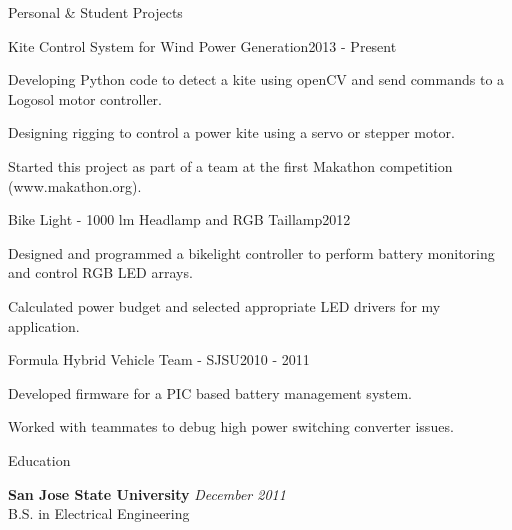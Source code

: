 \documentclass{resume} %
\begin{document}
\pagebreak[3]
\begin{rSection}{Personal \& Student Projects}

\ssquish
\begin{rProject}{Kite Control System for Wind Power Generation}{2013 - Present}
\item Developing Python code to detect a kite using openCV and send commands to a Logosol motor controller.
\item Designing rigging to control a power kite using a servo or stepper motor.
\item Started this project as part of a team at the first Makathon competition (www.makathon.org).
\end{rProject}

\ssquish
\begin{rProject}{Bike Light - 1000 lm Headlamp and RGB Taillamp}{2012}
\item Designed and programmed a bikelight controller to perform battery monitoring and control RGB LED arrays.
\item Calculated power budget and selected appropriate LED drivers for my application.
\end{rProject}

\ssquish
\begin{rProject}{Formula Hybrid Vehicle Team - SJSU}{2010 - 2011}
\item Developed firmware for a PIC based battery management system.
\item Worked with teammates to debug high power switching converter issues.
\end{rProject}
\end{rSection}


\pagebreak[3]
\begin{rSection}{Education}

{\bf San Jose State University} \hfill {\em December 2011} \\ 
B.S. in Electrical Engineering \\

\end{rSection}





\end{document}
